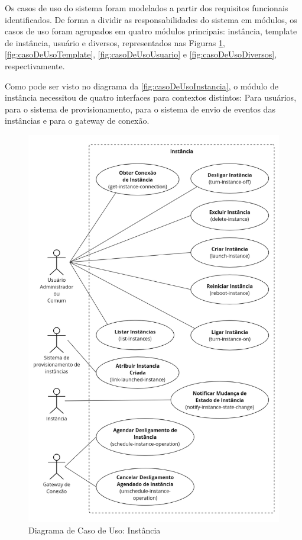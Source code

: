 Os casos de uso do sistema foram modelados a partir dos requisitos funcionais identificados. De forma a dividir as responsabilidades do sistema em módulos, os casos de uso foram agrupados em quatro módulos principais: instância, template de instância, usuário e diversos, representados nas Figuras \ref{fig:casoDeUsoInstancia}, \ref{fig:casoDeUsoTemplate}, \ref{fig:casoDeUsoUsuario} e \ref{fig:casoDeUsoDiversos}, respectivamente.

Como pode ser visto no diagrama da \autoref{fig:casoDeUsoInstancia}, o módulo de instância necessitou de quatro interfaces para contextos distintos: Para usuários, para o sistema de provisionamento, para o sistema de envio de eventos das instâncias e para o gateway de conexão.

\begin{figure}[H]
\caption{Diagrama de Caso de Uso: Instância}
\label{fig:casoDeUsoInstancia}
\includegraphics[width=\textwidth]{capitulos/2-metodologia/files/use-case-instance.png}
\end{figure}

